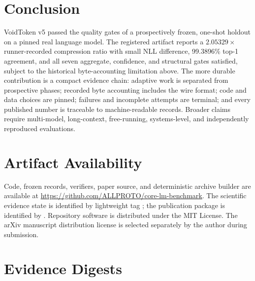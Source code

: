 \documentclass[10pt,twocolumn]{article}
\begin{document}
\section{Conclusion}

VoidToken v5 passed the quality gates of a prospectively frozen, one-shot
holdout on a pinned real language model. The registered artifact reports a
$2.05329\times$ runner-recorded compression ratio with small NLL difference,
99.3896\% top-1 agreement, and all seven aggregate, confidence, and structural
gates satisfied, subject to the historical byte-accounting limitation above.
The more durable contribution is a compact evidence chain: adaptive work is
separated from prospective phases; recorded byte accounting includes the wire
format; code and data choices are pinned; failures and incomplete
attempts are terminal; and every published number is traceable to
machine-readable records. Broader claims require multi-model, long-context,
free-running, systems-level, and independently reproduced evaluations.

\section*{Artifact Availability}

Code, frozen records, verifiers, paper source, and deterministic archive
builder are available at
\url{https://github.com/ALLPROTO/core-lm-benchmark}. The scientific evidence
state is identified by lightweight tag
; the publication package is identified by
. Repository software is distributed under the
MIT License. The arXiv manuscript distribution license is selected separately
by the author during submission.




\appendix

\section{Evidence Digests}
\label{app:digests}
\end{document}
